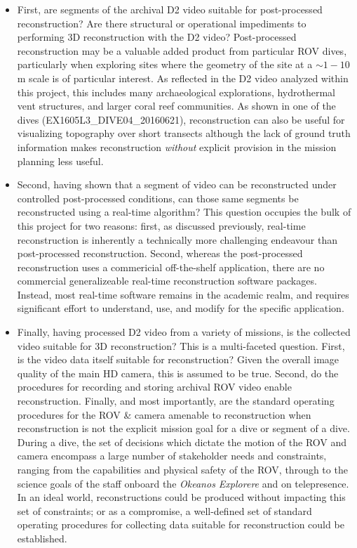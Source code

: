 \documentclass[letterpaper,12pt]{article}
\begin{document}
\begin{itemize}
    \item First, are segments of the archival D2 video suitable for post-processed reconstruction?   Are there structural or operational impediments to performing 3D reconstruction with the D2 video?   Post-processed reconstruction may be a valuable added product from particular ROV dives, particularly when exploring sites where the geometry of the site at a $\sim 1-10$ m scale is of particular interest.  As reflected in the D2 video analyzed within this project, this includes many archaeological explorations,  hydrothermal vent structures, and larger coral reef communities.   As shown in one of the dives (EX1605L3\_DIVE04\_20160621), reconstruction can also be useful for visualizing topography over short transects although the lack of ground truth information makes reconstruction \textit{without} explicit provision in the mission planning less useful.
    
    \item Second, having shown that a segment of video can be reconstructed under controlled post-processed conditions, can those same segments be reconstructed using a real-time algorithm?   This question occupies the bulk of this project for two reasons:  first, as discussed previously, real-time reconstruction is inherently a technically more challenging endeavour than post-processed reconstruction.  Second, whereas the post-processed reconstruction uses a commericial off-the-shelf application, there are no commercial generalizeable real-time reconstruction software packages.  Instead, most real-time software remains in the academic realm, and requires significant effort to understand, use, and modify for the specific application.  

    \item Finally, having processed D2 video from a variety of missions, is the collected video suitable for 3D reconstruction?  This is a multi-faceted question.  First, is the video data itself suitable for reconstruction?  Given the overall image quality of the main HD camera, this is assumed to be true.  Second, do the procedures for recording and storing archival ROV video enable reconstruction.   Finally, and most importantly, are the standard operating procedures for the ROV \& camera amenable to reconstruction when reconstruction is not the explicit mission goal for a dive or segment of a dive.  During a dive, the set of decisions which dictate the motion of the ROV and camera encompass a large number of stakeholder needs and constraints, ranging from the capabilities and physical safety of the ROV, through to the science goals of the staff onboard the \textit{Okeanos Explorere} and on telepresence.  In an ideal world, reconstructions could be produced without impacting this set of constraints; or as a compromise, a well-defined set of standard operating procedures for collecting data suitable for reconstruction could be established.  
    
\end{itemize}
\end{document}
